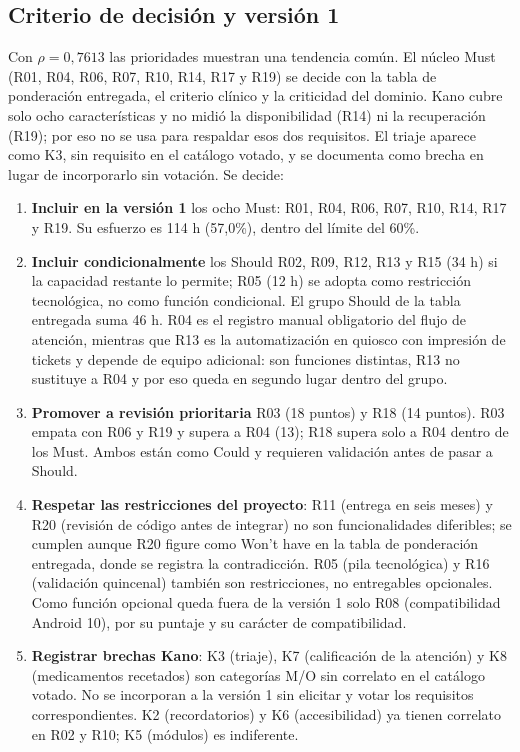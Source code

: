 ﻿\subsection{Criterio de decisión y versión 1}

Con $\rho = 0{,}7613$ las prioridades muestran una tendencia común. El núcleo Must (R01, R04, R06, R07, R10, R14, R17 y R19) se decide con la tabla de ponderación entregada, el criterio clínico y la criticidad del dominio. Kano cubre solo ocho características y no midió la disponibilidad (R14) ni la recuperación (R19); por eso no se usa para respaldar esos dos requisitos. El triaje aparece como K3, sin requisito en el catálogo votado, y se documenta como brecha en lugar de incorporarlo sin votación. Se decide:

\begin{enumerate}
  \item \textbf{Incluir en la versión 1} los ocho Must: R01, R04, R06, R07, R10, R14, R17 y R19. Su esfuerzo es 114 h (57,0\%), dentro del límite del 60\%.
  \item \textbf{Incluir condicionalmente} los Should R02, R09, R12, R13 y R15 (34 h) si la capacidad restante lo permite; R05 (12 h) se adopta como restricción tecnológica, no como función condicional. El grupo Should de la tabla entregada suma 46 h. R04 es el registro manual obligatorio del flujo de atención, mientras que R13 es la automatización en quiosco con impresión de tickets y depende de equipo adicional: son funciones distintas, R13 no sustituye a R04 y por eso queda en segundo lugar dentro del grupo.
  \item \textbf{Promover a revisión prioritaria} R03 (18 puntos) y R18 (14 puntos). R03 empata con R06 y R19 y supera a R04 (13); R18 supera solo a R04 dentro de los Must. Ambos están como Could y requieren validación antes de pasar a Should.
  \item \textbf{Respetar las restricciones del proyecto}: R11 (entrega en seis meses) y R20 (revisión de código antes de integrar) no son funcionalidades diferibles; se cumplen aunque R20 figure como Won't have en la tabla de ponderación entregada, donde se registra la contradicción. R05 (pila tecnológica) y R16 (validación quincenal) también son restricciones, no entregables opcionales. Como función opcional queda fuera de la versión 1 solo R08 (compatibilidad Android 10), por su puntaje y su carácter de compatibilidad.
  \item \textbf{Registrar brechas Kano}: K3 (triaje), K7 (calificación de la atención) y K8 (medicamentos recetados) son categorías M/O sin correlato en el catálogo votado. No se incorporan a la versión 1 sin elicitar y votar los requisitos correspondientes. K2 (recordatorios) y K6 (accesibilidad) ya tienen correlato en R02 y R10; K5 (módulos) es indiferente.
\end{enumerate}

